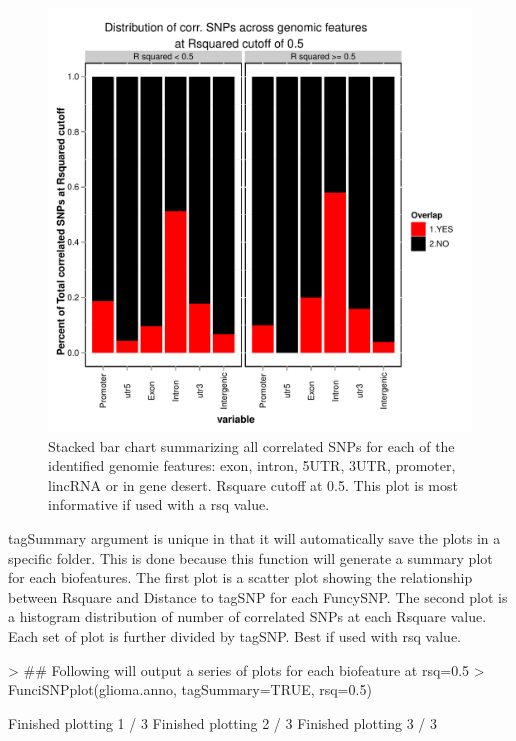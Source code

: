 \documentclass[a4paper]{article}
\begin{document}
\begin{figure}[ht!]
\begin{center}
\includegraphics{glioma_genomic_sum_rcut.pdf}
\caption{\label{fig:glioma_genomic_sum_rcut.pdf} Stacked bar chart summarizing 
all correlated SNPs for each of the identified genomie features: exon, intron, 
5UTR, 3UTR, promoter, lincRNA or in gene desert. Rsquare cutoff
 at 0.5. This plot is most informative if used with a rsq value.}
{\footnotesize{}}
\end{center}
\end{figure}
tagSummary argument is unique in that it will automatically save the plots in a
specific folder. This is done because this function will generate a summary 
plot for each biofeatures.  The first plot is a scatter plot showing 
the relationship between Rsquare and Distance to tagSNP for each FuncySNP. The
 second plot is a histogram distribution of number of correlated SNPs at each 
 Rsquare value. Each set of plot is further divided by tagSNP. Best if used with
  rsq value.
\begin{Schunk}
\begin{Sinput}
> ## Following will output a series of plots for each biofeature at rsq=0.5
> FunciSNPplot(glioma.anno, tagSummary=TRUE, rsq=0.5)
\end{Sinput}
\begin{Soutput}
Finished plotting  1 / 3 
Finished plotting  2 / 3 
Finished plotting  3 / 3 
\end{Soutput}
\end{Schunk}
\end{document}
